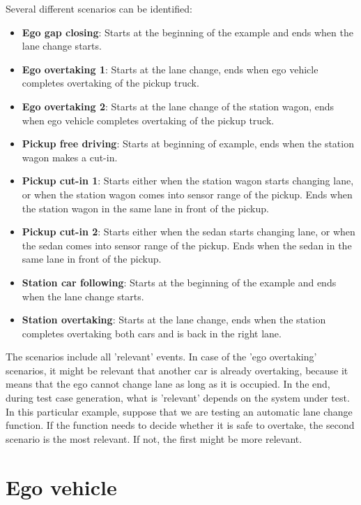 \documentclass[10pt,final,a4paper,oneside,onecolumn]{article}
\theoremstyle{plain}\newtheorem{definition}{Definition}[section]    %
\theoremstyle{definition}\newtheorem{example}{Example}[section]     %
\theoremstyle{remark}\newtheorem{remarkenv}{Remark}[section]        %
\begin{document}
Several different scenarios can be identified:
\begin{itemize} 
    \item \textbf{Ego gap closing}: Starts at the beginning of the example and ends when the lane change starts.
    \item \textbf{Ego overtaking 1}: Starts at the lane change, ends when ego vehicle completes overtaking of the pickup truck.
    \item \textbf{Ego overtaking 2}: Starts at the lane change of the station wagon, ends when ego vehicle completes overtaking of the pickup truck.
    \item \textbf{Pickup free driving}: Starts at beginning of example, ends when the station wagon makes a cut-in.
    \item \textbf{Pickup cut-in 1}: Starts either when the station wagon starts changing lane, or when the station wagon comes into sensor range of the pickup. Ends when the station wagon in the same lane in front of the pickup.
    \item \textbf{Pickup cut-in 2}: Starts either when the sedan starts changing lane, or when the sedan comes into sensor range of the pickup. Ends when the sedan in the same lane in front of the pickup.
    \item \textbf{Station car following}: Starts at the beginning of the example and ends when the lane change starts.
    \item \textbf{Station overtaking}: Starts at the lane change, ends when the station completes overtaking both cars and is back in the right lane.
\end{itemize}
The scenarios include all 'relevant' events. In case of the 'ego overtaking' scenarios, it might be relevant that another car is already overtaking, because it means that the ego cannot change lane as long as it is occupied. In the end, during test case generation, what is 'relevant' depends on the system under test. In this particular example, suppose that we are testing an automatic lane change function. If the function needs to decide whether it is safe to overtake, the second scenario is the most relevant. If not, the first might be more relevant.

\section{Ego vehicle}
\end{document}
